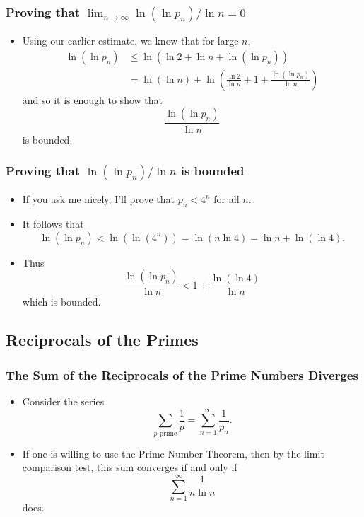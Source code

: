 \documentclass{beamer}
\begin{document}
\begin{frame}
    \frametitle{Proving that $\lim_{n \to \infty} \ln(\ln p_n) \slash \ln n = 0$}

    \begin{itemize}
        \item Using our earlier estimate, we know that for large $n$,
        \begin{align*}
            \ln(\ln p_n) & \leq \ln\left(\ln 2 + \ln n + \ln(\ln p_n) \right) \\
            & = \ln(\ln n) + \ln\left(\frac{\ln 2}{\ln n} + 1 + \frac{\ln(\ln p_n)}{\ln n}\right)
        \end{align*}
        and so it is enough to show that
        \[
            \frac{\ln(\ln p_n)}{\ln n}
        \]
        is bounded.
    \end{itemize} 

\end{frame}

\begin{frame}
    \frametitle{Proving that $\ln(\ln p_n) \slash \ln n$ is bounded}

    \begin{itemize}
        \item If you ask me nicely, I'll prove that $p_n < 4^n$ for all $n$. \pause
        \item It follows that
        \[
            \ln(\ln p_n) < \ln\left(\ln\left( 4^n \right)\right) = \ln\left( n \ln 4 \right) = \ln n + \ln(\ln 4).
        \]
        \pause
        \item Thus
        \[
            \frac{\ln(\ln p_n)}{\ln n} < 1 + \frac{\ln(\ln 4)}{\ln n}    
        \]
        which is bounded.
    \end{itemize} 

\end{frame}

\subsection{Reciprocals of the Primes}

\begin{frame}
    \frametitle{The Sum of the Reciprocals of the Prime Numbers Diverges}

    \begin{itemize}
        \item Consider the series
        \[
            \sum_{p \text{ prime}} \frac{1}{p} = \sum_{n = 1}^{\infty} \frac{1}{p_n}.   
        \] \pause
        \item If one is willing to use the Prime Number Theorem, then by the limit comparison test, this sum converges if and only if
        \[
            \sum_{n = 1}^{\infty} \frac{1}{n \ln n}    
        \]
        does.
    \end{itemize} 

\end{frame}
\end{document}
